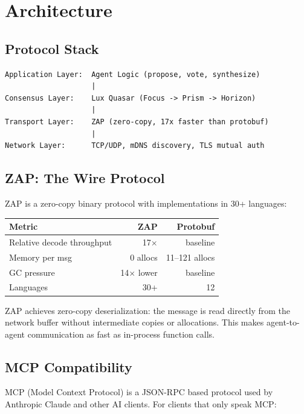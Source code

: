 \documentclass[11pt,a4paper]{article}
\begin{document}
\section{Architecture}

\subsection{Protocol Stack}

\begin{verbatim}
Application Layer:  Agent Logic (propose, vote, synthesize)
                    |
Consensus Layer:    Lux Quasar (Focus -> Prism -> Horizon)
                    |
Transport Layer:    ZAP (zero-copy, 17x faster than protobuf)
                    |
Network Layer:      TCP/UDP, mDNS discovery, TLS mutual auth
\end{verbatim}

\subsection{ZAP: The Wire Protocol}

ZAP is a zero-copy binary protocol with implementations in 30+ languages:

\begin{center}
\begin{tabular}{lrr}
\toprule
\textbf{Metric} & \textbf{ZAP} & \textbf{Protobuf} \\
\midrule
Relative decode throughput & 17$\times$ & baseline \\
Memory per msg & 0 allocs & 11--121 allocs \\
GC pressure & 14$\times$ lower & baseline \\
Languages & 30+ & 12 \\
\bottomrule
\end{tabular}
\end{center}

ZAP achieves zero-copy deserialization: the message is read directly from the network buffer without intermediate copies or allocations. This makes agent-to-agent communication as fast as in-process function calls.

\subsection{MCP Compatibility}

MCP (Model Context Protocol) is a JSON-RPC based protocol used by Anthropic Claude and other AI clients. For clients that only speak MCP:
\end{document}
